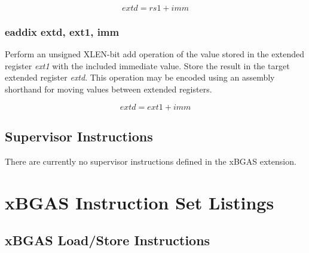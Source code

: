 \documentclass{article}
\begin{document}
\begin{equation}
extd = rs1 + imm
\end{equation}

\subsubsection{eaddix extd, ext1, imm}

Perform an unsigned XLEN-bit add operation of the value stored in the extended
register \textit{ext1} with the included immediate value.  Store the result in the 
target extended register \textit{extd}.  This operation may be encoded using 
an assembly shorthand for moving values between extended registers.  

\begin{equation}
extd = ext1 + imm
\end{equation}

\subsection{Supervisor Instructions}

There are currently no supervisor instructions defined in the xBGAS extension.  

\newpage
\section{xBGAS Instruction Set Listings}

\subsection{xBGAS Load/Store Instructions}
\end{document}
